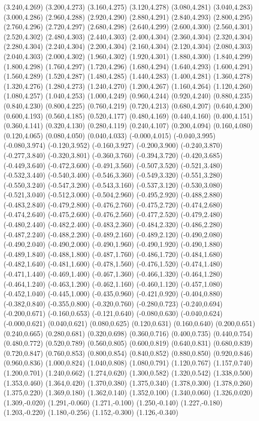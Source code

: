 (3.240,4.269) (3.200,4.273) (3.160,4.275) (3.120,4.278) (3.080,4.281) (3.040,4.283) (3.000,4.286) (2.960,4.288) (2.920,4.290) (2.880,4.291) (2.840,4.293) (2.800,4.295) (2.760,4.296) (2.720,4.297) (2.680,4.298) (2.640,4.299) (2.600,4.300) (2.560,4.301) (2.520,4.302) (2.480,4.303) (2.440,4.303) (2.400,4.304) (2.360,4.304) (2.320,4.304) (2.280,4.304) (2.240,4.304) (2.200,4.304) (2.160,4.304) (2.120,4.304) (2.080,4.303) (2.040,4.303) (2.000,4.302) (1.960,4.302) (1.920,4.301) (1.880,4.300) (1.840,4.299) (1.800,4.298) (1.760,4.297) (1.720,4.296) (1.680,4.294) (1.640,4.293) (1.600,4.291) (1.560,4.289) (1.520,4.287) (1.480,4.285) (1.440,4.283) (1.400,4.281) (1.360,4.278) (1.320,4.276) (1.280,4.273) (1.240,4.270) (1.200,4.267) (1.160,4.264) (1.120,4.260) (1.080,4.257) (1.040,4.253) (1.000,4.249) (0.960,4.244) (0.920,4.240) (0.880,4.235) (0.840,4.230) (0.800,4.225) (0.760,4.219) (0.720,4.213) (0.680,4.207) (0.640,4.200) (0.600,4.193) (0.560,4.185) (0.520,4.177) (0.480,4.169) (0.440,4.160) (0.400,4.151) (0.360,4.141) (0.320,4.130) (0.280,4.119) (0.240,4.107) (0.200,4.094) (0.160,4.080) (0.120,4.065) (0.080,4.050) (0.040,4.033) (-0.000,4.015) (-0.040,3.995) (-0.080,3.974) (-0.120,3.952) (-0.160,3.927) (-0.200,3.900) (-0.240,3.870) (-0.277,3.840) (-0.320,3.801) (-0.360,3.760) (-0.394,3.720) (-0.420,3.685) (-0.449,3.640) (-0.472,3.600) (-0.491,3.560) (-0.507,3.520) (-0.521,3.480) (-0.532,3.440) (-0.540,3.400) (-0.546,3.360) (-0.549,3.320) (-0.551,3.280) (-0.550,3.240) (-0.547,3.200) (-0.543,3.160) (-0.537,3.120) (-0.530,3.080) (-0.521,3.040) (-0.512,3.000) (-0.504,2.960) (-0.495,2.920) (-0.488,2.880) (-0.483,2.840) (-0.479,2.800) (-0.476,2.760) (-0.475,2.720) (-0.474,2.680) (-0.474,2.640) (-0.475,2.600) (-0.476,2.560) (-0.477,2.520) (-0.479,2.480) (-0.480,2.440) (-0.482,2.400) (-0.483,2.360) (-0.484,2.320) (-0.486,2.280) (-0.487,2.240) (-0.488,2.200) (-0.489,2.160) (-0.489,2.120) (-0.490,2.080) (-0.490,2.040) (-0.490,2.000) (-0.490,1.960) (-0.490,1.920) (-0.490,1.880) (-0.489,1.840) (-0.488,1.800) (-0.487,1.760) (-0.486,1.720) (-0.484,1.680) (-0.482,1.640) (-0.481,1.600) (-0.478,1.560) (-0.476,1.520) (-0.474,1.480) (-0.471,1.440) (-0.469,1.400) (-0.467,1.360) (-0.466,1.320) (-0.464,1.280) (-0.464,1.240) (-0.463,1.200) (-0.462,1.160) (-0.460,1.120) (-0.457,1.080) (-0.452,1.040) (-0.445,1.000) (-0.435,0.960) (-0.421,0.920) (-0.404,0.880) (-0.382,0.840) (-0.355,0.800) (-0.320,0.760) (-0.280,0.723) (-0.240,0.694) (-0.200,0.671) (-0.160,0.653) (-0.121,0.640) (-0.080,0.630) (-0.040,0.624) (-0.000,0.621) (0.040,0.621) (0.080,0.625) (0.120,0.631) (0.160,0.640) (0.200,0.651) (0.240,0.665) (0.280,0.681) (0.320,0.698) (0.360,0.716) (0.400,0.735) (0.440,0.754) (0.480,0.772) (0.520,0.789) (0.560,0.805) (0.600,0.819) (0.640,0.831) (0.680,0.839) (0.720,0.847) (0.760,0.853) (0.800,0.854) (0.840,0.852) (0.880,0.850) (0.920,0.846) (0.960,0.836) (1.000,0.824) (1.040,0.808) (1.080,0.791) (1.120,0.767) (1.157,0.740) (1.200,0.701) (1.240,0.662) (1.274,0.620) (1.300,0.582) (1.320,0.542) (1.338,0.500) (1.353,0.460) (1.364,0.420) (1.370,0.380) (1.375,0.340) (1.378,0.300) (1.378,0.260) (1.375,0.220) (1.369,0.180) (1.362,0.140) (1.352,0.100) (1.340,0.060) (1.326,0.020) (1.309,-0.020) (1.291,-0.060) (1.271,-0.100) (1.250,-0.140) (1.227,-0.180) (1.203,-0.220) (1.180,-0.256) (1.152,-0.300) (1.126,-0.340) 